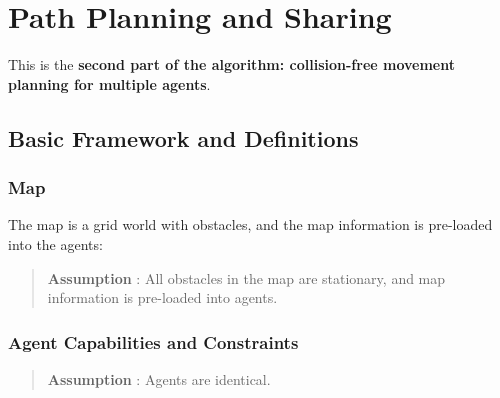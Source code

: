 

\section{Path Planning and Sharing}

This is the \textbf{second part of the algorithm: collision-free movement planning for multiple agents}.


\subsection{Basic Framework and Definitions}


\subsubsection{Map}
The map is a grid world with obstacles, and the map information is pre-loaded into the agents:
\begin{quotation}
    \textbf{Assumption }: 
    All obstacles in the map are stationary, and map information is pre-loaded into agents.
\end{quotation}

\subsubsection{Agent Capabilities and Constraints}


\begin{quotation}
    \textbf{Assumption }: 
    Agents are identical.
\end{quotation}

